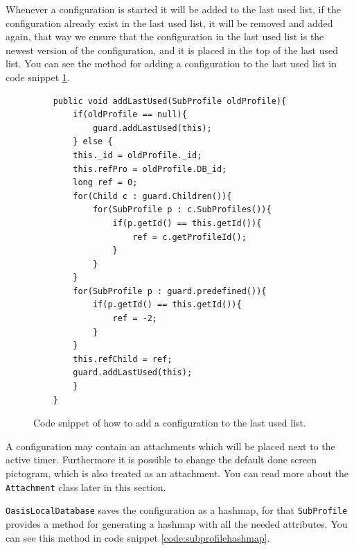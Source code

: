 \begin{description}
	Whenever a configuration is started it will be added to the last used list, if the configuration already exist in the last used list, it will be removed and added again, that way we ensure that the configuration in the last used list is the newest version of the configuration, and it is placed in the top of the last used list. You can see the method for adding a configuration to the last used list in code snippet \ref{code:addlastused}.
	
\begin{figure}[H]
\begin{lstlisting}
	public void addLastUsed(SubProfile oldProfile){
		if(oldProfile == null){
			guard.addLastUsed(this);
		} else {
		this._id = oldProfile._id;
		this.refPro = oldProfile.DB_id;
		long ref = 0;
		for(Child c : guard.Children()){
			for(SubProfile p : c.SubProfiles()){
				if(p.getId() == this.getId()){
					ref = c.getProfileId();
				}
			}
		}
		for(SubProfile p : guard.predefined()){
			if(p.getId() == this.getId()){
				ref = -2;
			}
		}
		this.refChild = ref;
		guard.addLastUsed(this);
		}
	}
\end{lstlisting}
\caption{Code snippet of how to add a configuration to the last used list.}%
\label{code:addlastused}%
\end{figure}
	
	A configuration may contain an attachments which will be placed next to the active timer. Furthermore it is possible to change the default done screen pictogram, which is also treated as an attachment. You can read more about the \texttt{Attachment} class later in this section.
	
	\texttt{OasisLocalDatabase} saves the configuration as a hashmap, for that \texttt{SubProfile} provides a method for generating a hashmap with all the needed attributes. You can see this method in code snippet \ref{code:subprofilehashmap}.
	

\end{description}
